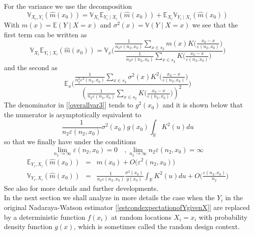 \documentclass[a4paper,12pt,leqno, titlepage]{article}
\newcommand{\EX}{\mathbb{E}}
\newcommand{\VAR}{\mathbb{V}}
\newcommand{\R}{\mathbb{R}}
\begin{document}
\begin{appendix}
For the variance we use the decomposition
\begin{equation}\label{overallvar1}
\VAR_{X_i,Y_i}(\hat{m}(x_0))=\VAR_{X_i}\EX_{Y_i\mid X_i}(\hat{m}(x_0))+\EX_{X_i}\VAR_{Y_i\mid X_i}(\hat{m}(x_0))
\end{equation}
With $m(x)=\EX(Y\mid X=x)$ and $\sigma^2(x)=\VAR(Y\mid X=x)$ we see that the first term can be written as
\begin{equation}\label{overallvar2}
\VAR_{X_i}\EX_{Y_i\mid X_i}(\hat{m}(x_0))=\VAR_x\Big(\frac{\frac{1}{n_2\varepsilon(n_2,x_0)}\sum_{x\in{s_2}}m(x)K\big(\frac{x_0-x}{\varepsilon(n_2,x_0)}\big)}
{\frac{1}{n_2\varepsilon(n_2,x_0)}\sum_{x\in{s_2}}K\big(\frac{x_0-x}{\varepsilon(n_2,x_0)}\big)}\Big)
\end{equation}
and the second as
\begin{equation}\label{overallvar3}
\EX_x\Big(\frac{\frac{1}{n^2_2\varepsilon^2(n_2,x_0)}\sum_{x\in{s_2}}\sigma^2(x)K^2\big(\frac{x_0-x}{\varepsilon(n_2,x_0)}\big)}
{(\frac{1}{n_2\varepsilon(n_2,x_0)}\sum_{x\in{s_2}}K\big(\frac{x_0-x}{\varepsilon(n_2,x_0)}\big))^2}\Big)
\end{equation}
The denominator in [\ref{overallvar3}] tends to $g^2(x_0)$ and it is shown below that the numerator is asymptotically equivalent to
$$\frac{1}{n_2\varepsilon(n_2,x_0)}\sigma^2(x_0)g(x_0)\int_{\R}K^2(u)du$$
so that we finally have under the conditions
$$\lim_{n_2\to\infty}\varepsilon(n_2,x_0)=0\quad, \lim_{n_2\to\infty}n_2\varepsilon(n_2,x_0)=\infty$$
\begin{eqnarray}\label{overallvar4}
\EX_{Y_i,X_i}(\hat{m}(x_0))&=&m(x_0)+ O\big(\varepsilon^2(n_2,x_0)\big) \nonumber\\
\VAR_{Y_i,X_i}(\hat{m}(x_0))&=&\frac{1}{n_2\varepsilon(n_2,x_0)}\frac{\sigma^2(x_0)}{g(x_0)}\int_{\R}K^2(u)du
+O\big(\frac{\varepsilon(n_2,x_0)}{n_2}\big)
\end{eqnarray}
See also \cite{glad1} for more details and further developments.\\
 In the next section we shall analyze in more details the case when the $Y_i$ in the original Nadaraya-Watson estimator [\ref{estcondexpectationofYgivenX}] are replaced by a deterministic function $f(x_i)$ at random locations $X_i=x_i$ with probability density function $g(x)$, which is sometimes called the random design context.




\end{appendix}
\end{document}
